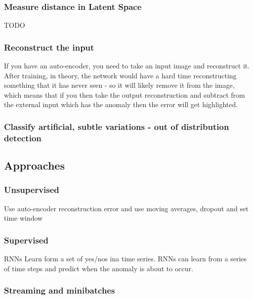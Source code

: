 \documentclass[11pt]{article}
\begin{document}
\subsubsection{Measure distance in Latent Space}

TODO

\subsubsection{Reconstruct the input}

If you have an auto-encoder, you need to take an input image and reconstruct it. After training, in theory, the network would have a hard time reconstructing something that it has never seen - so it will likely remove it from the image, which means that if you then take the output reconstruction and subtract from the external input which has the anomaly then the error will get highlighted.

\subsubsection{Classify artificial, subtle variations - out of distribution detection}

\subsection{Approaches}

\subsubsection{Unsupervised}

Use auto-encoder reconstruction error and use moving averages, dropout and set time window

\subsubsection{Supervised}

RNNs Learn form a set of yes/nos ina  time series. RNNs can learn from a series of time steps and predict when the anomaly is about to occur.

\subsubsection{Streaming and minibatches}
\end{document}
